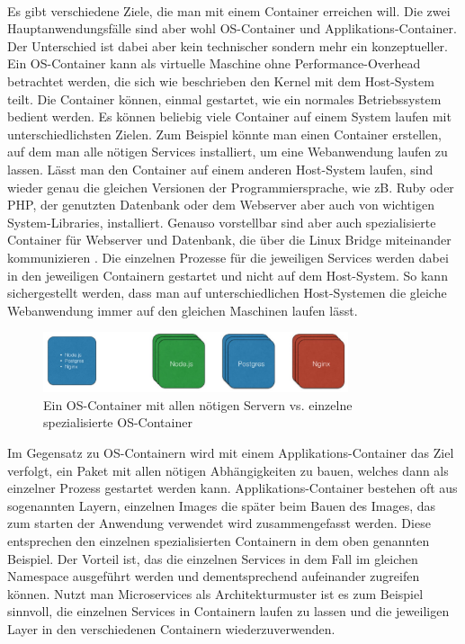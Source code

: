 \paragraph{}
Es gibt verschiedene Ziele, die man mit einem Container erreichen will. Die zwei Hauptanwendungsfälle sind aber wohl OS-Container und Applikations-Container. Der Unterschied ist dabei aber kein technischer sondern mehr ein konzeptueller.\\
Ein OS-Container kann als virtuelle Maschine ohne Performance-Overhead betrachtet werden, die sich wie beschrieben den Kernel mit dem Host-System teilt. Die Container können, einmal gestartet, wie ein normales Betriebssystem bedient werden. Es können beliebig viele Container auf einem System laufen mit unterschiedlichsten Zielen. Zum Beispiel könnte man einen Container erstellen, auf dem man alle nötigen Services installiert, um eine Webanwendung laufen zu lassen. Lässt man den Container auf einem anderen Host-System laufen, sind wieder genau die gleichen Versionen der Programmiersprache, wie zB. Ruby oder PHP, der genutzten Datenbank oder dem Webserver aber auch von wichtigen System-Libraries, installiert. Genauso vorstellbar sind aber auch spezialisierte Container für Webserver und Datenbank, die über die Linux Bridge miteinander kommunizieren \cite{ocvsac}. Die einzelnen Prozesse für die jeweiligen Services werden dabei in den jeweiligen Containern gestartet und nicht auf dem Host-System. So kann sichergestellt werden, dass man auf unterschiedlichen Host-Systemen die gleiche Webanwendung immer auf den gleichen Maschinen laufen lässt.

\begin{figure}[!ht]
  \centering
  \includegraphics[width=0.8\textwidth]{images/os-specialized-containers.jpg}
  \caption{Ein OS-Container mit allen nötigen Servern vs. einzelne spezialisierte OS-Container}
\end{figure}

Im Gegensatz zu OS-Containern wird mit einem Applikations-Container das Ziel verfolgt, ein Paket mit allen nötigen Abhängigkeiten zu bauen, welches dann als einzelner Prozess gestartet werden kann.
Applikations-Container bestehen oft aus sogenannten Layern, einzelnen Images die später beim Bauen des Images, das zum starten der Anwendung verwendet wird zusammengefasst werden. Diese entsprechen den einzelnen spezialisierten Containern in dem oben genannten Beispiel. Der Vorteil ist, das die einzelnen Services in dem Fall im gleichen Namespace ausgeführt werden und dementsprechend aufeinander zugreifen können. Nutzt man Microservices als Architekturmuster ist es zum Beispiel sinnvoll, die einzelnen Services in Containern laufen zu lassen und die jeweiligen Layer in den verschiedenen Containern wiederzuverwenden.

